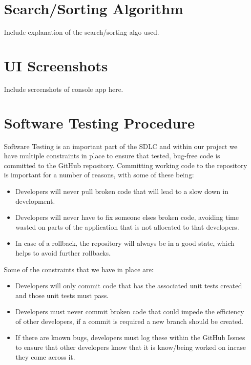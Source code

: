 \documentclass[
  english,
  a4paper,
,tablecaptionabove
]{scrartcl}
\providecommand{\tightlist}{%
  \setlength{\itemsep}{0pt}\setlength{\parskip}{0pt}}
\begin{document}
\newpage

\hypertarget{searchsorting-algorithm}{%
\section{Search/Sorting Algorithm}\label{searchsorting-algorithm}}

Include explanation of the search/sorting algo used.

\newpage

\hypertarget{ui-screenshots}{%
\section{UI Screenshots}\label{ui-screenshots}}

Include screenshots of console app here.

\newpage

\hypertarget{software-testing-procedure}{%
\section{Software Testing Procedure}\label{software-testing-procedure}}

Software Testing is an important part of the SDLC and within our project
we have multiple constraints in place to ensure that tested, bug-free
code is committed to the GitHub repository. Committing working code to
the repository is important for a number of reasons, with some of these
being:

\begin{itemize}
\tightlist
\item
  Developers will never pull broken code that will lead to a slow down
  in development.
\item
  Developers will never have to fix someone elses broken code, avoiding
  time wasted on parts of the application that is not allocated to that
  developers.
\item
  In case of a rollback, the repository will always be in a good state,
  which helps to avoid further rollbacks.
\end{itemize}

Some of the constraints that we have in place are:

\begin{itemize}
\tightlist
\item
  Developers will only commit code that has the associated unit tests
  created and those unit tests must pass.
\item
  Developers must never commit broken code that could impede the
  efficiency of other developers, if a commit is required a new branch
  should be created.
\item
  If there are known bugs, developers must log these within the GitHub
  Issues to ensure that other developers know that it is know/being
  worked on incase they come across it.
\end{itemize}
\end{document}
